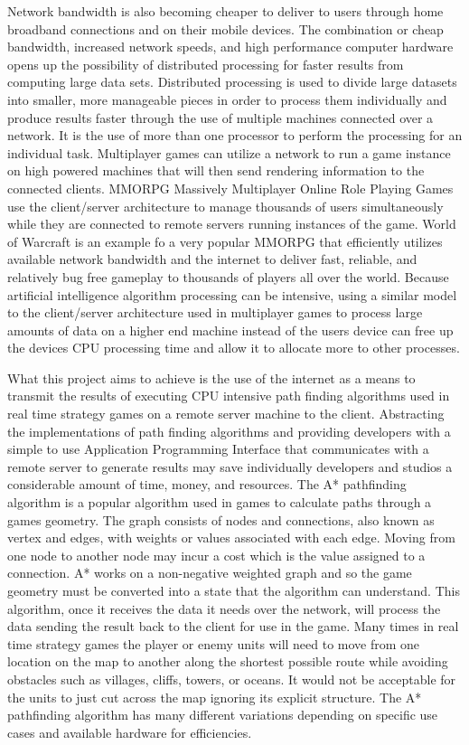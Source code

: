 \documentclass[12pt,a4paper,titlepage]{article}
\begin{document}
Network bandwidth is also becoming cheaper to deliver to users through home broadband connections and on their mobile devices. The combination or cheap bandwidth, increased network speeds, and high performance computer hardware opens up the possibility of distributed processing for faster results from computing large data sets. Distributed processing is used to divide large datasets into smaller, more manageable pieces in order to process them individually and produce results faster through the use of multiple machines connected over a network. It is the use of more than one processor to perform the processing for an individual task\cite{distributedprocessing}. Multiplayer games can utilize a network to run a game instance on high powered machines that will then send rendering information to the connected clients. MMORPG Massively Multiplayer Online Role Playing Games use the client/server architecture to manage thousands of users simultaneously while they are connected to remote servers running instances of the game. World of Warcraft\cite{worldofwarcraft} is an example fo a very popular MMORPG that efficiently utilizes available network bandwidth and the internet to deliver fast, reliable, and relatively bug free gameplay to thousands of players all over the world. Because artificial intelligence algorithm processing can be intensive, using a similar model to the client/server architecture used in multiplayer games to process large amounts of data on a higher end machine instead of the users device can free up the devices CPU processing time and allow it to allocate more to other processes.

What this project aims to achieve is the use of the internet as a means to transmit the results of executing CPU intensive path finding algorithms used in real time strategy games on a remote server machine to the client. Abstracting the implementations of path finding algorithms and providing developers with a simple to use Application Programming Interface that communicates with a remote server to generate results may save individually developers and studios a considerable amount of time, money, and resources. The A* pathfinding algorithm is a popular algorithm used in games to calculate paths through a games geometry. The graph consists of nodes and connections, also known as vertex and edges, with weights or values associated with each edge. Moving from one node to another node may incur a cost which is the value assigned to a connection. A* works on a non-negative weighted graph\cite[p.~198]{nonnegativeweightedgraph} and so the game geometry must be converted into a state that the algorithm can understand. This algorithm, once it receives the data it needs over the network, will process the data sending the result back to the client for use in the game. Many times in real time strategy games the player or enemy units will need to move from one location on the map to another along the shortest possible route while avoiding obstacles such as villages, cliffs, towers, or oceans. It would not be acceptable for the units to just cut across the map ignoring its explicit structure. The A* pathfinding algorithm has many different variations depending on specific use cases and available hardware for efficiencies. 
\end{document}
